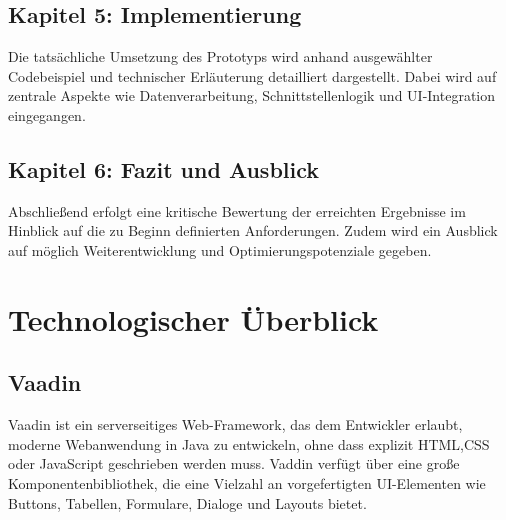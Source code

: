 \documentclass[a4paper,12pt]{scrreprt}
\begin{document}
	\section*{\small \textbf{Kapitel 5: Implementierung}}
	Die tatsächliche Umsetzung des Prototyps wird anhand ausgewählter Codebeispiel und technischer Erläuterung detailliert dargestellt. Dabei wird auf zentrale Aspekte wie Datenverarbeitung, Schnittstellenlogik und UI-Integration eingegangen.
	\section*{\small \textbf{Kapitel 6: Fazit und Ausblick}}
	Abschließend erfolgt eine kritische Bewertung der erreichten Ergebnisse im Hinblick auf die zu Beginn definierten Anforderungen. Zudem wird ein Ausblick auf möglich Weiterentwicklung und Optimierungspotenziale gegeben.
	
	\chapter{Technologischer Überblick}
	\section{Vaadin}
	Vaadin ist ein serverseitiges Web-Framework, das dem Entwickler erlaubt, moderne Webanwendung in Java zu entwickeln, ohne dass explizit HTML,CSS oder JavaScript geschrieben werden muss. Vaddin verfügt über eine große Komponentenbibliothek, die eine Vielzahl an vorgefertigten UI-Elementen wie Buttons, Tabellen, Formulare, Dialoge und Layouts bietet.
	
\end{document}
